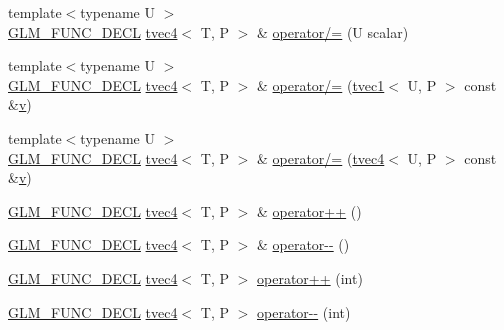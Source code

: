 \begin{DoxyCompactItemize}
\item 
{\footnotesize template$<$typename U $>$ }\\\mbox{\hyperlink{setup_8hpp_ab2d052de21a70539923e9bcbf6e83a51}{G\+L\+M\+\_\+\+F\+U\+N\+C\+\_\+\+D\+E\+CL}} \mbox{\hyperlink{structglm_1_1tvec4}{tvec4}}$<$ T, P $>$ \& \mbox{\hyperlink{structglm_1_1tvec4_a9db36befe0fef144842aa4b1097a953c}{operator/=}} (U scalar)
\item 
{\footnotesize template$<$typename U $>$ }\\\mbox{\hyperlink{setup_8hpp_ab2d052de21a70539923e9bcbf6e83a51}{G\+L\+M\+\_\+\+F\+U\+N\+C\+\_\+\+D\+E\+CL}} \mbox{\hyperlink{structglm_1_1tvec4}{tvec4}}$<$ T, P $>$ \& \mbox{\hyperlink{structglm_1_1tvec4_a617a3db69dfecb4f10bf7199eaf8e071}{operator/=}} (\mbox{\hyperlink{structglm_1_1tvec1}{tvec1}}$<$ U, P $>$ const \&\mbox{\hyperlink{glad_8h_a14cfbe2fc2234f5504618905b69d1e06}{v}})
\item 
{\footnotesize template$<$typename U $>$ }\\\mbox{\hyperlink{setup_8hpp_ab2d052de21a70539923e9bcbf6e83a51}{G\+L\+M\+\_\+\+F\+U\+N\+C\+\_\+\+D\+E\+CL}} \mbox{\hyperlink{structglm_1_1tvec4}{tvec4}}$<$ T, P $>$ \& \mbox{\hyperlink{structglm_1_1tvec4_ad00994666628d9c12846b274ba3a16a1}{operator/=}} (\mbox{\hyperlink{structglm_1_1tvec4}{tvec4}}$<$ U, P $>$ const \&\mbox{\hyperlink{glad_8h_a14cfbe2fc2234f5504618905b69d1e06}{v}})
\item 
\mbox{\hyperlink{setup_8hpp_ab2d052de21a70539923e9bcbf6e83a51}{G\+L\+M\+\_\+\+F\+U\+N\+C\+\_\+\+D\+E\+CL}} \mbox{\hyperlink{structglm_1_1tvec4}{tvec4}}$<$ T, P $>$ \& \mbox{\hyperlink{structglm_1_1tvec4_a63ee9187003ff40cb781a3cf3959475f}{operator++}} ()
\item 
\mbox{\hyperlink{setup_8hpp_ab2d052de21a70539923e9bcbf6e83a51}{G\+L\+M\+\_\+\+F\+U\+N\+C\+\_\+\+D\+E\+CL}} \mbox{\hyperlink{structglm_1_1tvec4}{tvec4}}$<$ T, P $>$ \& \mbox{\hyperlink{structglm_1_1tvec4_acf7152ff69c44483a6dcaa29926d25a3}{operator-\/-\/}} ()
\item 
\mbox{\hyperlink{setup_8hpp_ab2d052de21a70539923e9bcbf6e83a51}{G\+L\+M\+\_\+\+F\+U\+N\+C\+\_\+\+D\+E\+CL}} \mbox{\hyperlink{structglm_1_1tvec4}{tvec4}}$<$ T, P $>$ \mbox{\hyperlink{structglm_1_1tvec4_ad341796b1b7f91afcea916911db25bc6}{operator++}} (int)
\item 
\mbox{\hyperlink{setup_8hpp_ab2d052de21a70539923e9bcbf6e83a51}{G\+L\+M\+\_\+\+F\+U\+N\+C\+\_\+\+D\+E\+CL}} \mbox{\hyperlink{structglm_1_1tvec4}{tvec4}}$<$ T, P $>$ \mbox{\hyperlink{structglm_1_1tvec4_a57ff0a19184c138fab896a0f1743d442}{operator-\/-\/}} (int)

\end{DoxyCompactItemize}
